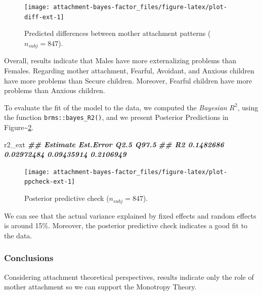 \documentclass[
]{book}
\newenvironment{Shaded}{\begin{snugshade}}{\end{snugshade}}
\newcommand{\DocumentationTok}[1]{\textcolor[rgb]{0.56,0.35,0.01}{\textbf{\textit{#1}}}}
\newcommand{\NormalTok}[1]{#1}
\begin{document}
\begin{figure}

{\centering \texttt{[image: attachment-bayes-factor\_files/figure-latex/plot-diff-ext-1]} 

}

\caption{Predicted differences between mother attachment patterns ($n_{subj} = 847$).}\label{fig:plot-diff-ext}
\end{figure}

Overall, results indicate that Males have more externalizing problems than Females. Regarding mother attachment, Fearful, Avoidant, and Anxious children have more problems than Secure children. Moreover, Fearful children have more problems than Anxious children.

To evaluate the fit of the model to the data, we computed the \emph{Bayesian} \(R^2\), using the function \texttt{brms::bayes\_R2()}, and we present Posterior Predictions in Figure\textasciitilde\ref{fig:plot-ppcheck-ext}.

\begin{Shaded}
\begin{Highlighting}[]
\NormalTok{r2\_ext}
\DocumentationTok{\#\#     Estimate  Est.Error       Q2.5     Q97.5}
\DocumentationTok{\#\# R2 0.1482686 0.02972484 0.09435914 0.2106949}
\end{Highlighting}
\end{Shaded}

\begin{figure}

{\centering \texttt{[image: attachment-bayes-factor\_files/figure-latex/plot-ppcheck-ext-1]} 

}

\caption{Posterior predictive check ($n_{subj} = 847$).}\label{fig:plot-ppcheck-ext}
\end{figure}

We can see that the actual variance explained by fixed effects and random effects is around 15\%. Moreover, the posterior predictive check indicates a good fit to the data.

\hypertarget{conclusions-2}{%
\subsubsection*{Conclusions}\label{conclusions-2}}

Considering attachment theoretical perspectives, results indicate only the role of mother attachment so we can support the Monotropy Theory.
\end{document}
